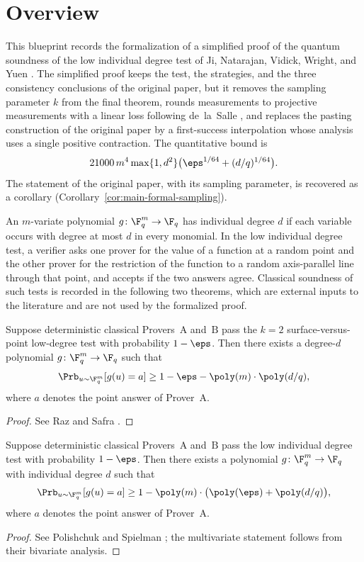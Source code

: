 \chapter{Overview}
\label{chap:overview}

This blueprint records the formalization of a simplified proof of the quantum
soundness of the low individual degree test of Ji, Natarajan, Vidick, Wright,
and Yuen \cite{Ji2020LowIndividualDegree}.  The simplified proof keeps the
test, the strategies, and the three consistency conclusions of the original
paper, but it removes the sampling parameter $k$ from the final theorem,
rounds measurements to projective measurements with a linear loss following
de~la~Salle \cite{deLaSalle2022Orthogonalization}, and replaces the pasting
construction of the original paper by a first-success interpolation whose
analysis uses a single positive contraction.  The quantitative bound is
\[
	21000\,m^4\max\{1,d^2\}\bigl(\eps^{1/64}+(d/q)^{1/64}\bigr).
\]
The statement of the original paper, with its sampling parameter, is recovered
as a corollary (Corollary~\ref{cor:main-formal-sampling}).

An $m$-variate polynomial $g\colon\F_q^m\to\F_q$ has individual degree $d$ if
each variable occurs with degree at most $d$ in every monomial.  In the low
individual degree test, a verifier asks one prover for the value of a function
at a random point and the other prover for the restriction of the function to
a random axis-parallel line through that point, and accepts if the two answers
agree.  Classical soundness of such tests is recorded in the following two
theorems, which are external inputs to the literature and are not used by the
formalized proof.

\begin{theorem}\label{thm:raz-safra}
	Suppose deterministic classical Provers~$\mathrm{A}$ and~$\mathrm{B}$ pass
	the $k=2$ surface-versus-point low-degree test with probability $1-\eps$.
	Then there exists a degree-$d$ polynomial $g\colon\F_q^m\to\F_q$ such that
	\[
		\Prb_{u\sim\F_q^m}[g(u)=a]\ge1-\eps-\poly(m)\cdot\poly(d/q),
	\]
	where $a$ denotes the point answer of Prover~$\mathrm{A}$.
\end{theorem}
\begin{proof}
	See Raz and Safra \cite{RazSafra1997}.
\end{proof}

\begin{theorem}\label{thm:classical-test-soundness}
	Suppose deterministic classical Provers~$\mathrm{A}$ and~$\mathrm{B}$ pass
	the low individual degree test with probability $1-\eps$.  Then there
	exists a polynomial $g\colon\F_q^m\to\F_q$ with individual degree $d$ such
	that
	\[
		\Prb_{u\sim\F_q^m}[g(u)=a]
		\ge1-\poly(m)\cdot\bigl(\poly(\eps)+\poly(d/q)\bigr),
	\]
	where $a$ denotes the point answer of Prover~$\mathrm{A}$.
\end{theorem}
\begin{proof}
	See Polishchuk and Spielman \cite{PolishchukSpielman1994}; the
	multivariate statement follows from their bivariate analysis.
\end{proof}

